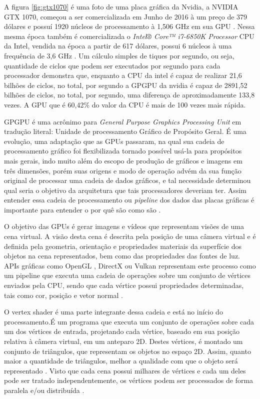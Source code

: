   A figura \ref{fig:gtx1070} é uma foto de uma placa gráfica da Nvidia, a NVIDIA GTX 1070, começou a ser comercializada em Junho de 2016 à um preço de 379 dólares e possuí 1920 núcleos de processamento à 1,506 GHz em sua GPU \citep{gtx1070:16}. Nessa mesma época também é comercializada o \textit{Intel® Core™ i7-6850K Processor} CPU da Intel, vendida na época a partir de 617 dólares, possui 6 núcleos à uma frequência de 3,6 GHz \citep{inteli7:16}. Um cálculo simples de tiques por segundo, ou seja, quantidade de ciclos que podem ser executados por segundo para cada processador demonstra que, enquanto a CPU da intel é capaz de realizar 21,6 bilhões de ciclos, no total, por segundo a GPGPU da nvidia é capaz de 2891,52 bilhões de ciclos, no total, por segundo, uma diferença de aproximadamente 133,8 vezes. A GPU que é 60,42\% do valor da CPU é mais de 100 vezes mais rápida.

  GPGPU é uma acrônimo para \textit{General Purpose Graphics Processing Unit} em tradução literal: Unidade de processamento Gráfico de Propósito Geral. É uma evolução, uma adaptação que as GPUs passaram, na qual sua cadeia de processamento gráfico foi flexibilizada tornado possível usá-la para propósitos mais gerais, indo muito além do escopo de produção de gráficos e imagens em três dimensões, porém suas origens e modo de operação advém da sua função original de processar uma cadeia de dados gráficos, e tal necessidade determinou qual seria o objetivo da arquitetura que tais processadores deveriam ter. Assim entender essa cadeia de processamento ou \textit{pipeline} dos dados das placas gráficas é importante para entender o por quê são como são \citep{massively:16}.

  O objetivo das GPUs é gerar imagens e vídeos que representam visões de uma cena virtual. A visão desta cena é descrita pela posição de uma câmera virtual e é definida pela geometria, orientação e propriedades materiais da superfície dos objetos na cena representados, bem como das propriedades das fontes de luz. APIs gráficas como OpenGL \citep{opengl}, DirectX \citep{directx} ou Vulkan\citep{vulkan} representam este processo como um pipeline que executa uma cadeia de operações sobre um conjunto de vértices enviados pela CPU, sendo que cada vértice possui propriedades determinadas, tais como cor, posição e vetor normal \citep{closer-look:08}.

  O vertex shader é uma parte integrante dessa cadeia e está no início do processamento.É um programa que executa um conjunto de operações sobre cada um dos vértices de entrada, projetando cada vértice, baseado em sua posição relativa à câmera virtual, em um anteparo 2D. Destes vértices, é montado um conjunto de triângulos, que representam os objetos no espaço 2D. Assim, quanto maior a quantidade de triângulos, melhor a qualidade com que o objeto será representado \citep{closer-look:08}. Visto que cada cena possui milhares de vértices e cada um deles pode ser tratado independentemente, os vértices podem ser processados de forma paralela e/ou distribuída \citep{gpu-comp:08}.

